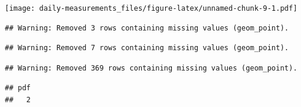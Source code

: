 \documentclass[
]{article}
\begin{document}
\texttt{[image: daily-measurements\_files/figure-latex/unnamed-chunk-9-1.pdf]}

\begin{verbatim}
## Warning: Removed 3 rows containing missing values (geom_point).
\end{verbatim}

\begin{verbatim}
## Warning: Removed 7 rows containing missing values (geom_point).
\end{verbatim}

\begin{verbatim}
## Warning: Removed 369 rows containing missing values (geom_point).
\end{verbatim}

\begin{verbatim}
## pdf 
##   2
\end{verbatim}
\end{document}
